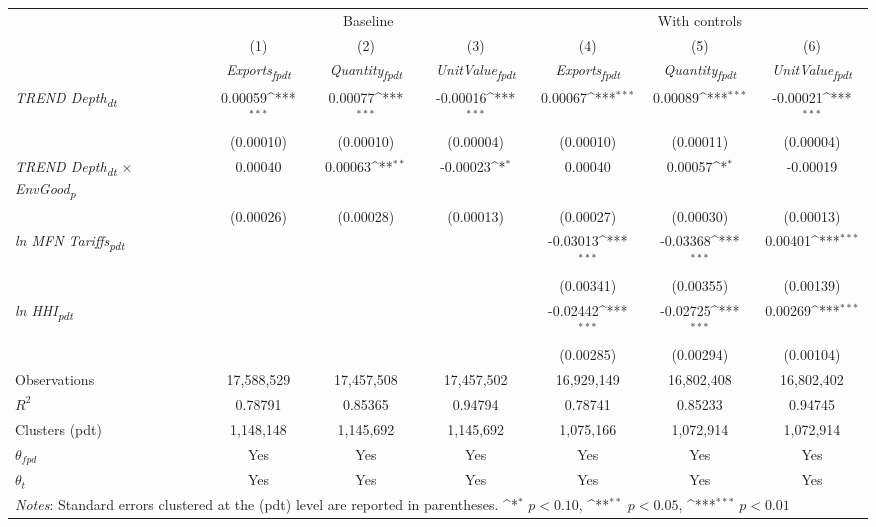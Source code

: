 {
\def\sym#1{\ifmmode^{#1}\else\(^{#1}\)\fi}
\begin{tabular}{l*{6}{c}}
\toprule
&\multicolumn{3}{c}{Baseline}&\multicolumn{3}{c}{With controls}\\\cmidrule(lr){2-4}\cmidrule(lr){5-7}
&(1)&(2)&(3)&(4)&(5)&(6)\\
&\textit{Exports\textsubscript{fpdt}}&\textit{Quantity\textsubscript{fpdt}}&\textit{UnitValue\textsubscript{fpdt}}&\textit{Exports\textsubscript{fpdt}}&\textit{Quantity\textsubscript{fpdt}}&\textit{UnitValue\textsubscript{fpdt}}\\
\midrule
\textit{TREND Depth\textsubscript{dt}} & 0.00059\sym{***} & 0.00077\sym{***} & -0.00016\sym{***} & 0.00067\sym{***} & 0.00089\sym{***} & -0.00021\sym{***}\\
 & (0.00010) & (0.00010) & (0.00004) & (0.00010) & (0.00011) & (0.00004)\\
\addlinespace
\textit{TREND Depth\textsubscript{dt} $\times$ EnvGood\textsubscript{p}} & 0.00040 & 0.00063\sym{**} & -0.00023\sym{*} & 0.00040 & 0.00057\sym{*} & -0.00019\\
 & (0.00026) & (0.00028) & (0.00013) & (0.00027) & (0.00030) & (0.00013)\\
\addlinespace
\textit{ln MFN Tariffs\textsubscript{pdt}} &  &  &  & -0.03013\sym{***} & -0.03368\sym{***} & 0.00401\sym{***}\\
 &  &  &  & (0.00341) & (0.00355) & (0.00139)\\
\addlinespace
\textit{ln HHI\textsubscript{pdt}} &  &  &  & -0.02442\sym{***} & -0.02725\sym{***} & 0.00269\sym{***}\\
 &  &  &  & (0.00285) & (0.00294) & (0.00104)\\
\midrule
Observations & 17,588,529 & 17,457,508 & 17,457,502 & 16,929,149 & 16,802,408 & 16,802,402\\
$R^{2}$ & 0.78791 & 0.85365 & 0.94794 & 0.78741 & 0.85233 & 0.94745\\
Clusters (pdt) & 1,148,148 & 1,145,692 & 1,145,692 & 1,075,166 & 1,072,914 & 1,072,914\\
$\theta_{fpd}$ & Yes & Yes & Yes & Yes & Yes & Yes\\
$\theta_{t}$ & Yes & Yes & Yes & Yes & Yes & Yes\\
\bottomrule
\multicolumn{7}{l}{\footnotesize \textit{Notes}: Standard errors clustered at the (pdt) level are reported in parentheses. \sym{*} \(p<0.10\), \sym{**} \(p<0.05\), \sym{***} \(p<0.01\)}\\
\end{tabular}
}
